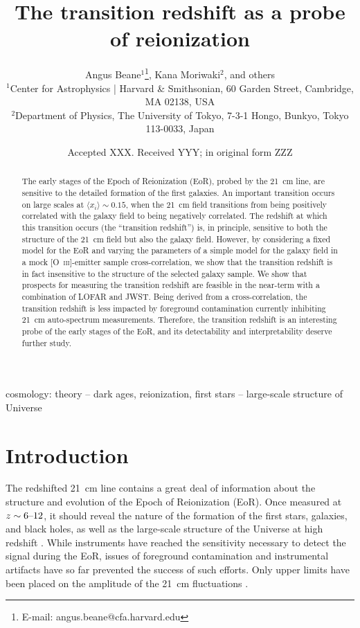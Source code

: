 \documentclass[a4paper,fleqn,usenatbib]{mnras}
\title[The transition redshift as an EoR probe]{The transition redshift as a probe of reionization}
\author[A. Beane, K. Moriwaki, ...]{
Angus Beane$^{1}$\thanks{E-mail: angus.beane@cfa.harvard.edu},
Kana Moriwaki$^{2}$,
and others
\\
$^{1}$Center for Astrophysics {\normalfont |} Harvard \& Smithsonian, 60 Garden Street, Cambridge, MA 02138, USA\\
$^{2}$Department of Physics, The University of Tokyo, 7-3-1 Hongo, Bunkyo, Tokyo 113-0033, Japan
}
\date{Accepted XXX. Received YYY; in original form ZZZ}
\newcommand{\avg}[1]{\ensuremath{\langle #1 \rangle}}
\begin{document}
\label{firstpage}
\pagerange{\pageref{firstpage}--\pageref{lastpage}}
\maketitle

\begin{abstract}
The early stages of the Epoch of Reionization (EoR), probed by the 21~cm line,
are sensitive to the detailed formation of the first galaxies. An important
transition occurs on large scales at $\avg{x_i}\sim0.15$, when the 21~cm field
transitions from being positively correlated with the galaxy field to being
negatively correlated. The redshift at which this transition occurs (the
``transition redshift'') is, in principle, sensitive to both the structure of
the 21~cm field but also the galaxy field. However, by considering a fixed
model for the EoR and varying the parameters of a simple model for the galaxy
field in a mock [O~\textsc{iii}]-emitter sample cross-correlation, we show
that the transition redshift is in fact insensitive to the structure of the
selected galaxy sample. We show that prospects for measuring the transition
redshift are feasible in the near-term with a combination of LOFAR and JWST.
Being derived from a cross-correlation, the transition redshift is less
impacted by foreground contamination currently inhibiting 21~cm auto-spectrum
measurements. Therefore, the transition redshift is an interesting probe of
the early stages of the EoR, and its detectability and interpretability
deserve further study.
\end{abstract}

\begin{keywords}
cosmology: theory -- dark ages, reionization, first stars -- large-scale
structure of Universe
\end{keywords}



\section{Introduction} \label{sec:intro}
The redshifted 21~cm line contains a great deal of information about the
structure and evolution of the Epoch of Reionization (EoR). Once measured at
$z\sim6\textup{--}12$, it should reveal the nature of the formation of the
first stars, galaxies, and black holes, as well as the large-scale structure
of the Universe at high redshift \citep{2013fgu..book.....L}. While
instruments have reached the sensitivity necessary to detect the signal during
the EoR, issues of foreground contamination and instrumental artifacts have so
far prevented the success of such efforts. Only upper limits have been placed
on the amplitude of the 21~cm fluctuations \citep[e.g.][]{2013MNRAS.433..639P,
2014PhRvD..89b3002D, 2016ApJ...833..102B, 2017ApJ...838...65P}.
\end{document}
